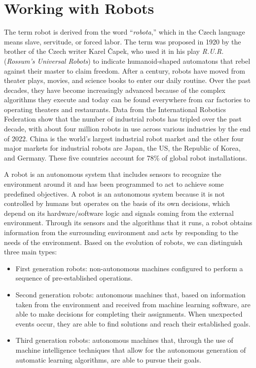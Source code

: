 \section{\label{sec:6.3}Working with Robots}

The term robot is derived from the word ``\textit{robota},'' which in the Czech language means slave, servitude, or forced labor. The term was proposed in 1920 by the brother of the Czech writer Karel \v{C}apek, who used it in his play \textit{R.U.R.} (\textit{Rossum's Universal Robots}) to indicate humanoid-shaped automatons that rebel against their master to claim freedom. After a century, robots have moved from theater plays, movies, and science books to enter our daily routine. Over the past decades, they have become increasingly advanced because of the complex algorithms they execute and today can be found everywhere from car factories to operating theaters and restaurants. Data from the International Robotics Federation show that the number of industrial robots has tripled over the past decade, with about four million robots in use across various industries by the end of 2022. China is the world's largest industrial robot market and the other four major markets for industrial robots are Japan, the US, the Republic of Korea, and Germany. These five countries account for 78\% of global robot installations.

A robot is an autonomous system that includes sensors to recognize the environment around it and has been programmed to act to achieve some predefined objectives. A robot is an autonomous system because it is not controlled by humans but operates on the basis of its own decisions, which depend on its hardware/software logic and signals coming from the external environment. Through its sensors and the algorithms that it runs, a robot obtains information from the surrounding environment and acts by responding to the needs of the environment. Based on the evolution of robots, we can distinguish three main types:

\begin{itemize}
\item First generation robots: non-autonomous machines configured to perform a sequence of pre-established operations.

\item Second generation robots: autonomous machines that, based on information taken from the environment and received from machine learning software, are able to make decisions for completing their assignments. When unexpected events occur, they are able to find solutions and reach their established goals.

\item Third generation robots: autonomous machines that, through the use of machine intelligence techniques that allow for the autonomous generation of automatic learning algorithms, are able to pursue their goals.
\end{itemize}

